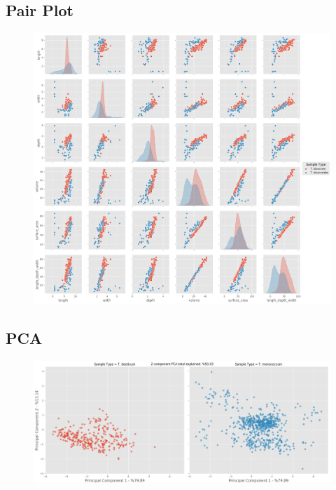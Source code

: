 \documentclass[11pt]{report}
\begin{document}
\subsection{Pair Plot}
\label{sec:org413f3c2}

\begin{figure}[htbp]
\centering
\includegraphics[width=18cm]{./images/results/group2/pairplot.png}
\label{fig:org8ba5566}
\end{figure}

\clearpage
\subsection{PCA}
\label{sec:orgf2b1357}
\begin{figure}[htbp]
\centering
\includegraphics[width=18cm]{./images/results/group2/pca.png}
\label{fig:org4942c5f}
\end{figure}
\end{document}
